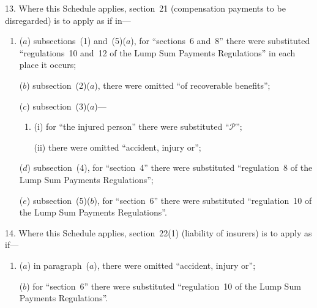 \documentclass[12pt,a4paper]{article}
\begin{document}
13.  Where this Schedule applies, section~21 (compensation payments to be disregarded) is to apply as if in—
\begin{enumerate}\item[]
($a$) subsections~(1) and~(5)($a$), for “sections~6 and~8” there were substituted “regulations~10 and~12 of the Lump Sum Payments Regulations” in each place it occurs;

($b$) subsection~(2)($a$), there were omitted “of recoverable benefits”;

($c$) subsection~(3)($a$)—
\begin{enumerate}\item[]
(i) for “the injured person” there were substituted “$\mathcal{P}$”;

(ii) there were omitted “accident, injury or”;
\end{enumerate}

($d$) subsection~(4), for “section~4” there were substituted “regulation~8 of the Lump Sum Payments Regulations”;

($e$) subsection~(5)($b$), for “section~6” there were substituted “regulation~10 of the Lump Sum Payments Regulations”.
\end{enumerate}

\medskip

14.  Where this Schedule applies, section~22(1) (liability of insurers) is to apply as if—
\begin{enumerate}\item[]
($a$) in paragraph~($a$), there were omitted “accident, injury or”;

($b$) for “section~6” there were substituted “regulation~10 of the Lump Sum Payments Regulations”.
\end{enumerate}

\medskip
\end{document}

